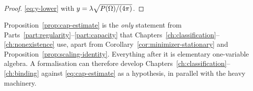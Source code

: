 \begin{proof}
\eqref{eq:y-lower} with $y=\lambda\sqrt{P(\Omega)/(4\pi)}$.
\end{proof}

\begin{fnote}\label{fnote:cap-interface}
Proposition~\ref{prop:cap-estimate} is the \emph{only} statement from
Parts~\ref{part:regularity}--\ref{part:capacity} that
Chapters~\ref{ch:classification}--\ref{ch:nonexistence} use, apart from
Corollary~\ref{cor:minimizer-stationary} and
Proposition~\ref{prop:scaling-identity}.  Everything after it is elementary
one-variable algebra.  A formalisation can therefore develop
Chapters~\ref{ch:classification}--\ref{ch:binding} against
\eqref{eq:cap-estimate} as a hypothesis, in parallel with the heavy machinery.
\end{fnote}

